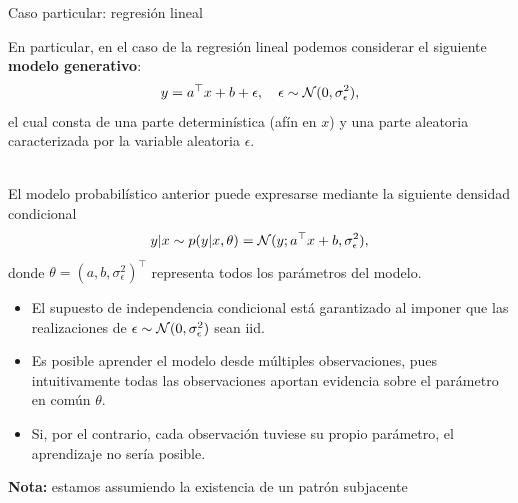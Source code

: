 \documentclass[handout, 9pt]{beamer}
\begin{document}
\begin{frame}{Caso particular: regresión lineal}
	
En particular, en el caso de la regresión lineal podemos considerar el siguiente \textbf{modelo  generativo}:
\begin{equation*}
	y = a^\top x + b + \epsilon,\quad \epsilon\sim{\mathcal N}(0,\sigma_\epsilon^2),
\end{equation*}
el cual consta de una parte determinística (afín en $x$) y una parte aleatoria caracterizada por la variable aleatoria $\epsilon$.\\~\ \pause

El modelo probabilístico anterior puede expresarse mediante la siguiente densidad condicional 
\begin{equation*}
	y|x \sim p(y|x,\theta) = {\mathcal N}(y;a^\top x + b ,\sigma_\epsilon^2),\label{eq:mod_lin_gau}
\end{equation*}
donde $\theta=(a,b,\sigma_\epsilon^2)^\top$ representa todos los parámetros del modelo. \pause

\begin{itemize}
	\item El supuesto de independencia condicional está garantizado al imponer que las realizaciones de $\epsilon\sim{\mathcal N}(0,\sigma_\epsilon^2)$ sean iid.\pause
	\item Es posible aprender el modelo desde múltiples observaciones, pues intuitivamente todas las observaciones aportan evidencia sobre el parámetro en común $\theta$. 
	\item  Si, por el contrario, cada observación tuviese su propio parámetro, el aprendizaje no sería posible.
\end{itemize}
 \textbf{Nota:} estamos assumiendo la existencia de un patrón subjacente\pause
	
\end{frame}
\end{document}
